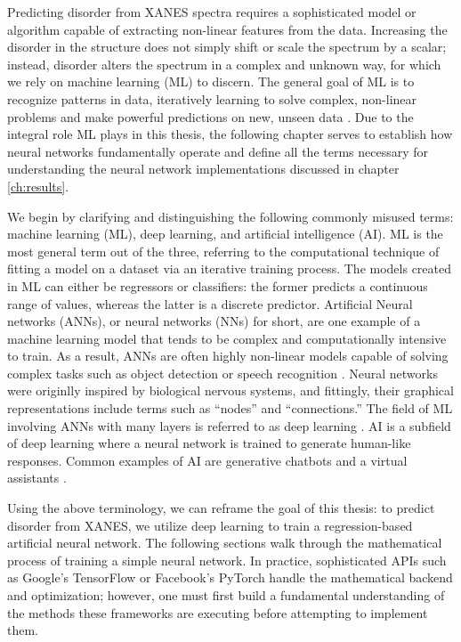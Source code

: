 Predicting disorder from XANES spectra requires a sophisticated model or algorithm capable of extracting non-linear features from the data. Increasing the disorder in the structure does not simply shift or scale the spectrum by a scalar; instead, disorder alters the spectrum in a complex and unknown way, for which we rely on machine learning  (ML) to discern. The general goal of ML is to recognize patterns in data, iteratively learning to solve complex, non-linear problems and make powerful predictions on new, unseen data \cite{ML-and-the-physical-sci}. Due to the integral role ML plays in this thesis, the following chapter serves to establish how neural networks fundamentally operate and define all the terms necessary for understanding the neural network implementations discussed in chapter \ref{ch:results}.

We begin by clarifying and distinguishing the following commonly misused terms: machine learning (ML), deep learning, and artificial intelligence (AI). ML is the most general term out of the three, referring to the computational technique of fitting a model on a dataset via an iterative training process. The models created in ML can either be regressors or classifiers: the former predicts a continuous range of values, whereas the latter is a discrete predictor. Artificial Neural networks (ANNs), or neural networks (NNs) for short, are one example of a machine learning model that tends to be complex and computationally intensive to train. As a result, ANNs are often highly non-linear models capable of solving complex tasks such as object detection \cite{szegedy2013deep} or speech recognition \cite{ms-speech-recognition-paper} \cite{speech-recognition}. Neural networks were originlly inspired by biological nervous systems, and fittingly, their graphical representations include terms such as ``nodes'' and ``connections.'' The field of ML involving ANNs with many layers is referred to as deep learning \cite{schmidhuber2015deep}. AI is a subfield of deep learning where a neural network is trained to generate human-like responses. Common examples of AI are generative chatbots \cite{chatbots} and a virtual assistants \cite{virtual-assistants} \cite{virtual-assistants2}. 

Using the above terminology, we can reframe the goal of this thesis: to predict disorder from XANES, we utilize deep learning to train a regression-based artificial neural network. The following sections walk through the mathematical process of training a simple neural network. In practice, sophisticated APIs such as Google's TensorFlow \cite{tensorflow2015-whitepaper} or Facebook's PyTorch \cite{pytorch-paper} handle the mathematical backend and optimization; however, one must first build a fundamental understanding of the methods these frameworks are executing before attempting to implement them.

